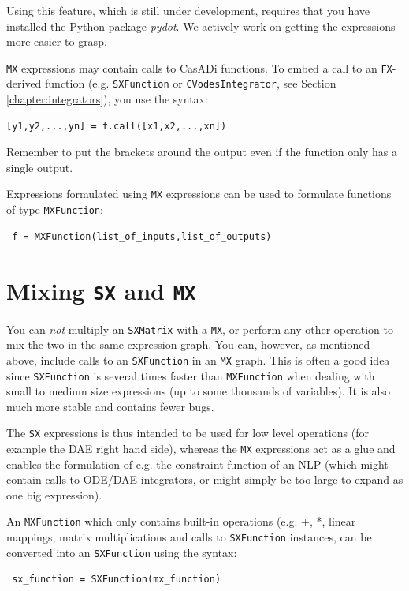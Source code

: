 \documentclass[a4paper,12pt]{book}
\begin{document}
{Using this feature, which is still under development, requires that you have installed the Python package \emph{pydot}. We actively work on getting the expressions more easier to grasp.

\texttt{MX} expressions may contain calls to CasADi functions. To embed a call to an \texttt{FX}-derived function (e.g. \texttt{SXFunction} or \texttt{CVodesIntegrator}, see Section \ref{chapter:integrators}), you use the syntax:
\begin{verbatim}
[y1,y2,...,yn] = f.call([x1,x2,...,xn])
\end{verbatim}

Remember to put the brackets around the output even if the function only has a single output.

Expressions formulated using \texttt{MX} expressions can be used to formulate functions of type \texttt{MXFunction}:
\begin{verbatim}
 f = MXFunction(list_of_inputs,list_of_outputs)
\end{verbatim}

\section{Mixing \texttt{SX} and \texttt{MX}}
You can \emph{not} multiply an \texttt{SXMatrix} with a \texttt{MX}, or perform any other operation to mix the two in the same expression graph. You can, however, as mentioned above, include calls to an \texttt{SXFunction} in an \texttt{MX} graph. This is often a good idea since \texttt{SXFunction} is several times faster than \texttt{MXFunction} when dealing with small to medium size expressions (up to some thousands of variables). It is also much more stable and contains fewer bugs. 

The \texttt{SX} expressions is thus intended to be used for low level operations (for example the DAE right hand side), whereas the \texttt{MX} expressions act as a glue and enables the formulation of e.g. the constraint function of an NLP (which might contain calls to ODE/DAE integrators, or might simply be too large to expand as one big expression).

An \texttt{MXFunction} which only contains built-in operations (e.g. +, *, linear mappings, matrix multiplications and calls to \texttt{SXFunction} instances, can be converted into an \texttt{SXFunction} using the syntax:
\begin{verbatim}
 sx_function = SXFunction(mx_function)
\end{verbatim}

}
\end{document}
